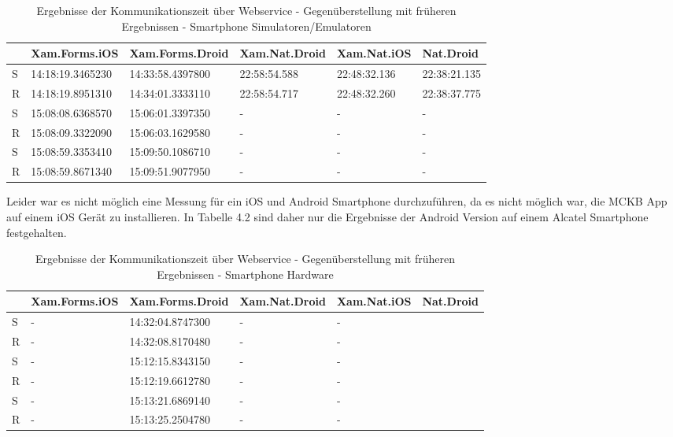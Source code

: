	\begin{table}[h!]
		\centering
		\begin{tabular}{l|l|l|l|l|l|}
			\cline{2-6}
			                        & Xam.Forms.iOS    & Xam.Forms.Droid  & Xam.Nat.Droid& Xam.Nat.iOS  & Nat.Droid    \\ \hline
			\multicolumn{1}{|l|}{S} & 14:18:19.3465230 & 14:33:58.4397800 & 22:58:54.588 & 22:48:32.136 & 22:38:21.135 \\ \hline
			\multicolumn{1}{|l|}{R} & 14:18:19.8951310 & 14:34:01.3333110 & 22:58:54.717 & 22:48:32.260 & 22:38:37.775 \\ \hline
			\multicolumn{1}{|l|}{S} & 15:08:08.6368570 & 15:06:01.3397350 & - & - & - \\ \hline
			\multicolumn{1}{|l|}{R} & 15:08:09.3322090 & 15:06:03.1629580 & - & - & - \\ \hline
			\multicolumn{1}{|l|}{S} & 15:08:59.3353410 & 15:09:50.1086710 & - & - & - \\ \hline
			\multicolumn{1}{|l|}{R} & 15:08:59.8671340 & 15:09:51.9077950 & - & - & - \\ \hline
		\end{tabular}
		\label{tab:clsvcom}
		\caption{Ergebnisse der Kommunikationszeit über Webservice - Gegenüberstellung mit früheren Ergebnissen\cite{Maximilian2017} - Smartphone Simulatoren/Emulatoren}
	\end{table}
	
	
	\newpage
	Leider war es nicht möglich eine Messung für ein iOS und Android Smartphone durchzuführen, da es nicht möglich war, die MCKB App auf einem iOS Gerät zu installieren. In Tabelle 4.2 sind daher nur die Ergebnisse der Android Version auf einem Alcatel Smartphone festgehalten.

	\begin{table}[h!]
		\centering
		\begin{tabular}{l|l|l|l|l|l|}
			\cline{2-6}
			                        & Xam.Forms.iOS    & Xam.Forms.Droid  & Xam.Nat.Droid& Xam.Nat.iOS  & Nat.Droid    \\ \hline
			\multicolumn{1}{|l|}{S} & 	  -			 & 14:32:04.8747300 & 		-	   & 	  -		  &  \\ \hline
			\multicolumn{1}{|l|}{R} & 	  -			 & 14:32:08.8170480 & 		-	   & 	  -		  &  \\ \hline
			\multicolumn{1}{|l|}{S} & 	  -			 & 15:12:15.8343150 & 		-	   & 	  -		  &  \\ \hline
			\multicolumn{1}{|l|}{R} & 	  -			 & 15:12:19.6612780 & 		-	   & 	  -		  &  \\ \hline
			\multicolumn{1}{|l|}{S} & 	  -			 & 15:13:21.6869140 & 		-	   & 	  -		  &  \\ \hline
			\multicolumn{1}{|l|}{R} & 	  -			 & 15:13:25.2504780 & 		-	   & 	  -		  &  \\ \hline
		\end{tabular}
		\label{tab:clsvcomhard}
		\caption{Ergebnisse der Kommunikationszeit über Webservice - Gegenüberstellung mit früheren Ergebnissen\cite{Maximilian2017} - Smartphone Hardware}
	\end{table}

